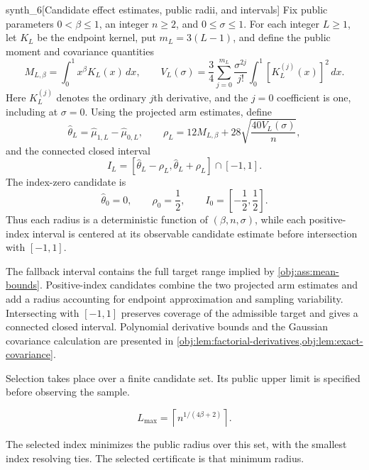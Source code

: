\documentclass[11pt]{article}
\begin{document}
\begin{definitionv}{synth_6}[Candidate effect estimates, public radii, and intervals]
Fix public parameters \(0<\beta\le1\), an integer \(n\ge2\), and \(0\le\sigma\le1\). For each integer \(L\ge1\), let \(K_L\) be the endpoint kernel, put \(m_L=3(L-1)\), and define the public moment and covariance quantities
\[
M_{L,\beta}=\int_0^1x^\beta K_L(x)\,dx,
\qquad
V_L(\sigma)=\frac34\sum_{j=0}^{m_L}
\frac{\sigma^{2j}}{j!}
\int_0^1[K_L^{(j)}(x)]^2\,dx.
\]
Here \(K_L^{(j)}\) denotes the ordinary \(j\)th derivative, and the \(j=0\) coefficient is one, including at \(\sigma=0\). Using the projected arm estimates, define
\[
\widehat\theta_L=\widehat\mu_{1,L}-\widehat\mu_{0,L},
\qquad
\rho_L=12M_{L,\beta}
+28\sqrt{\frac{40V_L(\sigma)}{n}},
\]
and the connected closed interval
\[
I_L=
[\widehat\theta_L-\rho_L,\widehat\theta_L+\rho_L]
\cap[-1,1].
\]
The index-zero candidate is
\[
\widehat\theta_0=0,\qquad
\rho_0=\frac12,\qquad
I_0=\left[-\frac12,\frac12\right].
\]
Thus each radius is a deterministic function of \((\beta,n,\sigma)\), while each positive-index interval is centered at its observable candidate estimate before intersection with \([-1,1]\).
\end{definitionv}

The fallback interval contains the full target range implied by \cref{obj:ass:mean-bounds}. Positive-index candidates combine the two projected arm estimates and add a radius accounting for endpoint approximation and sampling variability. Intersecting with \([-1,1]\) preserves coverage of the admissible target and gives a connected closed interval. Polynomial derivative bounds and the Gaussian covariance calculation are presented in \cref{obj:lem:factorial-derivatives,obj:lem:exact-covariance}.

Selection takes place over a finite candidate set. Its public upper limit  is specified before observing the sample.

\[
L_{\max}=\left\lceil n^{1/(4\beta+2)}\right\rceil.
\]

The selected index  minimizes the public radius over this set, with the smallest index resolving ties. The selected certificate  is that minimum radius.
\end{document}
